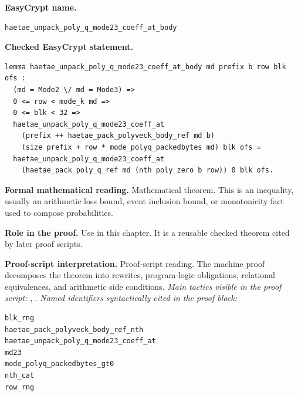 \begin{formaltheorem}
\noindent\textbf{EasyCrypt name.}
\begin{lstlisting}[language=EasyCrypt,basicstyle=\ttfamily\scriptsize]
haetae_unpack_poly_q_mode23_coeff_at_body
\end{lstlisting}
\noindent\textbf{Checked EasyCrypt statement.}
\begin{lstlisting}[language=EasyCrypt,basicstyle=\ttfamily\scriptsize]
lemma haetae_unpack_poly_q_mode23_coeff_at_body md prefix b row blk ofs :
  (md = Mode2 \/ md = Mode3) =>
  0 <= row < mode_k md =>
  0 <= blk < 32 =>
  haetae_unpack_poly_q_mode23_coeff_at
    (prefix ++ haetae_pack_polyveck_body_ref md b)
    (size prefix + row * mode_polyq_packedbytes md) blk ofs =
  haetae_unpack_poly_q_mode23_coeff_at
    (haetae_pack_poly_q_ref md (nth poly_zero b row)) 0 blk ofs.
\end{lstlisting}
\noindent\textbf{Formal mathematical reading.}
Mathematical theorem. This is an inequality, usually an arithmetic loss bound, event inclusion bound, or monotonicity fact used to compose probabilities.

\noindent\textbf{Role in the proof.}
Use in this chapter. It is a reusable checked theorem cited by later proof scripts.

\noindent\textbf{Proof-script interpretation.}
Proof-script reading. The machine proof decomposes the theorem into rewrites, program-logic obligations, relational equivalences, and arithmetic side conditions.
\emph{Main tactics visible in the proof script:} , .
\emph{Named identifiers syntactically cited in the proof block:}
\begin{lstlisting}[language=EasyCrypt,basicstyle=\ttfamily\scriptsize]
blk_rng
haetae_pack_polyveck_body_ref_nth
haetae_unpack_poly_q_mode23_coeff_at
md23
mode_polyq_packedbytes_gt0
nth_cat
row_rng
\end{lstlisting}

\end{formaltheorem}


